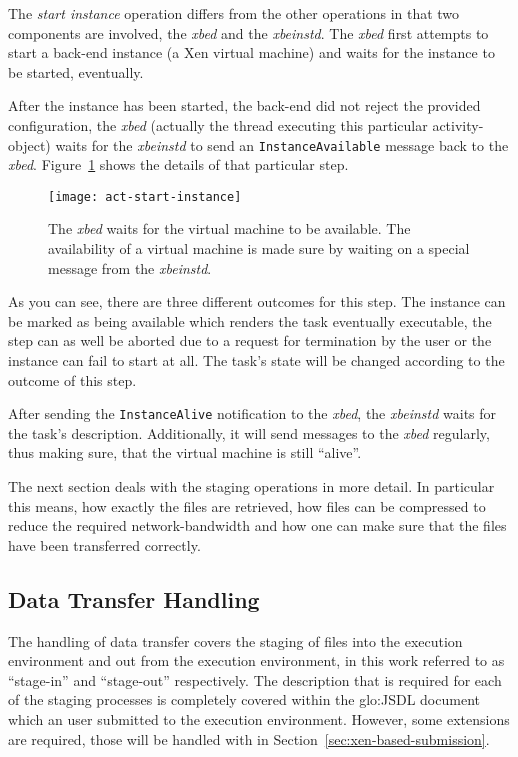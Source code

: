 The \emph{start  instance} operation differs from the  other operations in
that two components are involved, the \emph{xbed} and the \emph{xbeinstd}.
The \emph{xbed}  first attempts  to start a  back-end instance (\eg  a Xen
virtual machine) and waits for the instance to be started, eventually.

After the instance  has been started, \ie the back-end  did not reject the
provided  configuration, the  \emph{xbed} (actually  the  thread executing
this particular activity-object) waits  for the \emph{xbeinstd} to send an
\texttt{Instance\-Available}        message       back        to       the
\emph{xbed}. Figure~\ref{fig:act-start-instance} shows the details of that
particular step.

\begin{figure}[ht]
  \centering
  \texttt{[image: act-start-instance]}
  \caption[Start Instance Activity]{The  \emph{xbed} waits for the virtual
    machine to  be available.   The availability of  a virtual  machine is
    made sure by waiting on a special message from the \emph{xbeinstd}.}
  \label{fig:act-start-instance}
\end{figure}

As you  can see,  there are  three different outcomes  for this  step. The
instance  can  be  marked  as  being  available  which  renders  the  task
eventually executable,  the step can as  well be aborted due  to a request
for termination by the user or the  instance can fail to start at all. The
task's state will be changed according to the outcome of this step.

After   sending   the   \texttt{Instance\-Alive}   notification   to   the
\emph{xbed},  the  \emph{xbeinstd}   waits  for  the  task's  description.
Additionally,  it will send  messages to  the \emph{xbed}  regularly, thus
making sure, that the virtual machine is still ``alive''.

The  next section deals  with the  staging operations  in more  detail. In
particular this means, how exactly  the files are retrieved, how files can
be compressed  to reduce  the required network-bandwidth  and how  one can
make sure that the files have been transferred correctly.

\subsection{Data Transfer Handling}
\label{sec:xbed:data-transfer}

The  handling  of data  transfer  covers the  staging  of  files into  the
execution environment and out from the execution environment, in this work
referred   to  as  ``stage-in''   and  ``stage-out''   respectively.   The
description  that  is  required  for  each of  the  staging  processes  is
completely  covered  within  the  \gls{glo:JSDL} document  which  an  user
submitted  to the  execution  environment.  However,  some extensions  are
required,       those       will       be      handled       with       in
Section~\ref{sec:xen-based-submission}.

